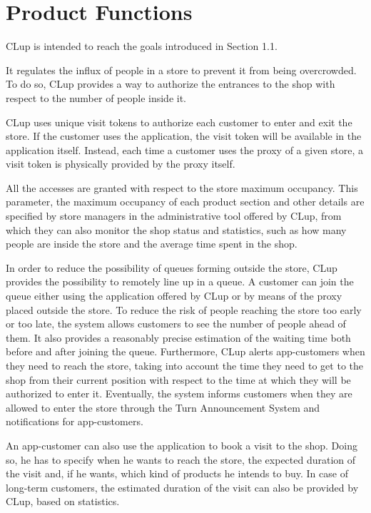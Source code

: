 \documentclass[a4paper,oneside,11pt]{book}   %
\begin{document}
    \section{Product Functions}
    CLup is intended to reach the goals introduced in Section 1.1. \par
    It regulates the influx of people in a store to prevent it from being overcrowded. To do so, CLup provides a way to authorize the entrances to the shop with respect to the number of people inside it. \par
    CLup uses unique visit tokens to authorize each customer to enter and exit the store. If the customer uses the application, the visit token will be available in the application itself. Instead, each time a customer uses the proxy of a given store, a visit token is physically provided by the proxy itself. \par
    All the accesses are granted with respect to the store maximum occupancy. This parameter, the maximum occupancy of each product section and other details are specified by store managers in the administrative tool offered by CLup, from which they can also monitor the shop status and statistics, such as how many people are inside the store and the average time spent in the shop. \par
    In order to reduce the possibility of queues forming outside the store, CLup provides the possibility to remotely line up in a queue. A customer can join the queue either using the application offered by CLup or by means of the proxy placed outside the store. To reduce the risk of people reaching the store too early or too late, the system allows customers to see the number of people ahead of them. It also provides a reasonably precise estimation of the waiting time both before and after joining the queue. Furthermore, CLup alerts app-customers when they need to reach the store, taking into account the time they need to get to the shop from their current position with respect to the time at which they will be authorized to enter it. Eventually, the system informs customers when they are allowed to enter the store through the Turn Announcement System and notifications for app-customers. \par
    An app-customer can also use the application to book a visit to the shop. Doing so, he has to specify when he wants to reach the store, the expected duration of the visit and, if he wants, which kind of products he intends to buy. In case of long-term customers, the estimated duration of the visit can also be provided by CLup, based on statistics. \par
\end{document}
